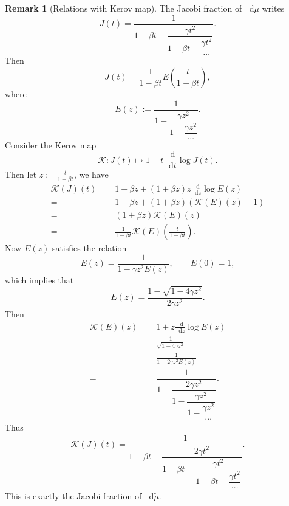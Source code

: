 \documentclass[a4paper]{article}
\theoremstyle{plain}
\theoremstyle{definition}
\newtheorem{remark}{Remark}
\newcommand{\dif}{\mathop{}\!\mathrm{d}}
\newcommand{\nn}{\nonumber}
\begin{document}
\begin{remark}[Relations with Kerov map]
	The Jacobi fraction of $\dif\mu$ writes
	\begin{equation}
		J(t)=\dfrac{1}{1-\beta t-\dfrac{\gamma t^2}{1-\beta t-\dfrac{\gamma t^2}{\cdots}}}.
	\end{equation} Then
	\begin{equation}
		J(t)=\frac{1}{1-\beta t}E\left(\frac{t}{1-\beta t}\right),
	\end{equation} where
	\begin{equation}
		E(z):=\dfrac{1}{1-\dfrac{\gamma z^2}{1-\dfrac{\gamma z^2}{\cdots}}}.
	\end{equation}
	Consider the Kerov map~\cite{Kerov,Zhou2}
	\begin{equation}
		\mathcal{K}:J(t)\mapsto 1+t\frac{\dif}{\dif t}\log J(t).
	\end{equation} Then let $z:=\frac{t}{1-\beta t}$, we have
	\begin{align}
		\mathcal{K}(J)(t)=&1+\beta z+(1+\beta z)z\frac{\dif}{\dif z}\log E(z)\nn\\
		=&1+\beta z+(1+\beta z)(\mathcal{K}(E)(z)-1)\nn\\
		=&(1+\beta z)\mathcal{K}(E)(z)\nn\\
		=&\frac{1}{1-\beta t}\mathcal{K}(E)\left(\frac{t}{1-\beta t}\right).
	\end{align}
	Now $E(z)$ satisfies the relation
	\begin{equation}
		E(z)=\frac{1}{1-\gamma z^2E(z)},\qquad E(0)=1,
	\end{equation} which implies that
	\begin{equation}
		E(z)=\frac{1-\sqrt{1-4\gamma z^2}}{2\gamma z^2}.
	\end{equation}
	Then
	\begin{align}
		\mathcal{K}(E)(z)=&1+z\frac{\dif}{\dif z}\log E(z)\nn\\
		=&\frac{1}{\sqrt{1-4\gamma z^2}}\nn\\
		=&\frac{1}{1-2\gamma z^2E(z)}\nn\\
		=&\dfrac{1}{1-\dfrac{2\gamma z^2}{1-\dfrac{\gamma z^2}{1-\dfrac{\gamma z^2}{\cdots}}}}.
	\end{align}
	Thus 
	\begin{align}
		\mathcal{K}(J)(t)=\dfrac{1}{1-\beta t-\dfrac{2\gamma t^2}{1-\beta t-\dfrac{\gamma t^2}{1-\beta t-\dfrac{\gamma t^2}{\cdots}}}}.
	\end{align}
	This is exactly the Jacobi fraction of $\dif\widetilde\mu$.
\end{remark}
\end{document}
